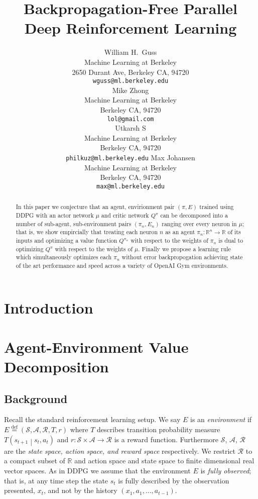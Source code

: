 \documentclass{article} %
\title{Backpropagation-Free Parallel Deep Reinforcement Learning}
\author{
William H.~Guss \\
Machine Learning at Berkeley\\
2650 Durant Ave, Berkeley CA, 94720 \\
\texttt{wguss@ml.berkeley.edu} \\
\And
Mike Zhong \\
Machine Learning at Berkeley \\
Berkeley CA, 94720 \\
\texttt{lol@gmail.com} \\
\And
Utkarsh S \\
Machine Learning at Berkeley \\
Berkeley CA, 94720 \\
\texttt{philkuz@ml.berkeley.edu}
\And
Max Johansen \\
Machine Learning at Berkeley \\
Berkeley CA, 94720 \\
\texttt{max@ml.berkeley.edu}
}
\numberwithin{equation}{subsection}
\numberwithin{theorem}{subsection}
\def\suchthat{\mathrel{}\middle|\mathrel{}}
\def\defeq{\stackrel{\text{def}}{=}}
\def\scripta{{\mathcal A}}
\def\scriptr{{\mathcal R}}
\def\scripts{{\mathcal S}}
\begin{document}
\maketitle

\begin{abstract}
	In this paper we conjecture that an agent, envirionment pair $(\pi, E)$ trained using DDPG with an actor network $\mu$ and critic network $Q^{\pi}$ can be decomposed into a number of sub-agent, sub-environment pairs  $(\pi_n, E_n)$ ranging over every neuron in $\mu$; that is, we show empircially that treating each neuron $n$ as an agent $\pi_n: \mathbb{R}^n \to \mathbb{R}$ of its inputs and optimizing a value function $Q^{\pi_n}$ with respect to the weights of $\pi_n$ is dual to optimizing $Q^\pi$ with respect to the weights of $\mu$. Finally we propose a learning rule which simultaneously optimizes each $\pi_n$ without error backpropogation achieving state of the art performance and speed across a variety of OpenAI Gym environments.
\end{abstract}
\listoftodos


\section{Introduction}




\section{Agent-Environment Value Decomposition}


\subsection{Background}
Recall the standard reinforcement learning setup. We say $E$ is an \emph{environment} if $E \defeq (\scripts, \scripta, \scriptr, T, r)$ where $T$ describes transition probability measure $T\left(s_{t+1}\suchthat s_t, a_t\right)$ and $r: \scripts \times \scripta \to \scriptr$ is a reward function. Furthermore $\scripts$, $\scripta$, $\scriptr$ are the \emph{state space, action space, and reward space} respectively. We restrict $\scriptr$ to a compact subset of $\mathbb{R}$ and action space and state space to finite dimensional real vector spaces. As in DDPG we assume that the environment $E$ is \emph{fully observed}; that is, at any time step the state $s_t$ is fully described by the observation presented, $x_t$, and not by the history $(x_1, a_1, \dots, a_{t-1}).$ 
\end{document}
